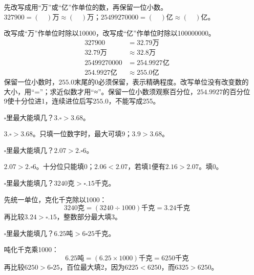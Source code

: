 先改写成用“万”或“亿”作单位的数，再保留一位小数。\(327900=(\quad)\text{万}\approx(\quad)\text{万}\)；\allowbreak{}\(25499270000=(\quad)\text{亿}\approx(\quad)\text{亿}\)。\par
\begin{BookAnswer}
改写成“万”作单位时除以10000，改写成“亿”作单位时除以100000000。\[\begin{aligned}327900&=32.79\text{万}\\32.79\text{万}&\approx32.8\text{万}\\25499270000&=254.9927\text{亿}\\254.9927\text{亿}&\approx255.0\text{亿}\end{aligned}\]保留一位小数时，\allowbreak{}\(255.0\)末尾的0必须保留，表示精确程度。改写单位没有改变数的大小，用“=”；求近似数才用“≈”。保留一位小数须观察百分位，\allowbreak{}\(254.9927\)的百分位9使十分位进1，连续进位后写\(255.0\)，不能写成255。
\end{BookAnswer}

\(\square\)里最大能填几？\(3.\square>3.68\)。\par
\begin{BookAnswer}
\(3.\square>3.68\)。只填一位数字时，最大可填9；\allowbreak{}\(3.9>3.68\)。
\end{BookAnswer}

\(\square\)里最大能填几？\(2.07>2.\square6\)。\par
\begin{BookAnswer}
\(2.07>2.\square6\)。十分位只能填0；\allowbreak{}\(2.06<2.07\)，若填1便有\(2.16>2.07\)。填0。
\end{BookAnswer}

\(\square\)里最大能填几？\(3240\text{克}>\square.15\text{千克}\)。\par
\begin{BookAnswer}
先统一单位，克化千克除以1000：\[3240\text{克}=(3240\div1000)\text{千克}=3.24\text{千克}\]再比较\(3.24>\square.15\)，整数部分最大填3。
\end{BookAnswer}

\(\square\)里最大能填几？\(6.25\text{吨}>6\square25\text{千克}\)。\par
\begin{BookAnswer}
吨化千克乘1000：\[6.25\text{吨}=(6.25\times1000)\text{千克}=6250\text{千克}\]再比较\(6250>6\square25\)，百位最大填2，因为\(6225<6250\)，而\(6325>6250\)。
\end{BookAnswer}

